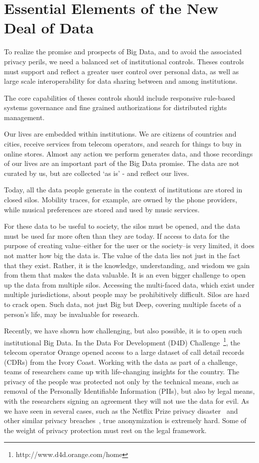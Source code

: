 \section{Essential Elements of the New Deal of Data}

To realize the promise and prospects of Big Data, and to avoid the associated privacy perils, we need a balanced set of institutional controls.
Theses controls must support and reflect a greater user control over personal data, as well as large scale interoperability for data sharing between and among institutions.

The core capabilities of theses controls should include responsive rule-based systems governance and fine grained authorizations for distributed rights management.

Our lives are embedded within institutions.
We are citizens of countries and cities, receive services from telecom operators, and search for things to buy in online stores.
Almost any action we perform generates data, and those recordings of our lives are an important part of the Big Data promise.
The data are not curated by us, but are collected `as is' - and reflect our lives.

Today, all the data people generate in the context of institutions are stored in closed silos. 
Mobility traces, for example, are owned by the phone providers, while musical preferences are stored and used by music services.

For these data to be useful to society, the silos must be opened, and the data must be used far more often than they are today.
If access to data for the purpose of creating value--either for the user or the society--is very limited, it does not matter how big the data is.
The value of the data lies not just in the fact that they exist.
Rather, it is the knowledge, understanding, and wisdom we gain from them that makes the data valuable.
It is an even bigger challenge to open up the data from multiple silos.
Accessing the multi-faced data, which exist under multiple jurisdictions, about people may be prohibitively difficult.
Silos are hard to crack open.
Such data, not just Big but Deep, covering multiple facets of a person's life, may be invaluable for research.

Recently, we have shown how challenging, but also possible, it is to open such institutional Big Data.
In the Data For Development (D4D) Challenge~\footnote{http://www.d4d.orange.com/home}, the telecom operator Orange opened access to a large dataset of call detail records (CDRs) from the Ivory Coast.
Working with the data as part of a challenge, teams of researchers came up with life-changing insights for the country.
The privacy of the people was protected not only by the technical means, such as removal of the Personally Identifiable Information (PIIs), but also by legal means, with the researchers signing an agreement they will not use the data for evil.
As we have seen in several cases, such as the Netflix Prize privacy disaster~\cite{narayanan2008robust} and other similar privacy breaches~\cite{sweeney2000simple}, true anonymization is extremely hard.
Some of the weight of privacy protection must rest on the legal framework.

